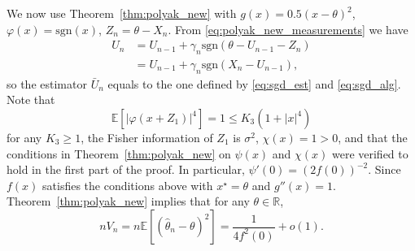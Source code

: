 \documentclass[letterpaper, 11pt]{IEEEtran}      %
\newcommand{\sgn}{\mathrm{sgn} }
\begin{document}
We now use Theorem~\ref{thm:polyak_new} with $g(x) = 0.5(x-\theta)^2$, $\varphi(x) = \sgn(x)$, $Z_n = \theta-X_n$. From \eqref{eq:polyak_new_measurements} we have
\begin{align*} 
U_n & = U_{n-1} + \gamma_n \sgn(\theta-U_{n-1} - Z_n )  \\
& = U_{n-1} + \gamma_n \sgn(X_n-U_{n-1} ),
\end{align*}
so the estimator $\bar{U}_n$ equals to the one defined by \eqref{eq:sgd_est} and \eqref{eq:sgd_alg}. Note that
\[
\mathbb E \left[ | \varphi(x+Z_1) |^4 \right] = 1 \leq K_3(1+|x|^4)
\]
for any $K_3\geq 1$, the Fisher information of $Z_1$ is $\sigma^2$, $\chi(x) = 1 > 0$, and that 
the conditions in Theorem~\ref{thm:polyak_new} on $\psi(x)$ and $\chi(x)$ were verified to hold in the first part of the proof. In particular, $\psi'(0) = (2f(0))^{-2}$. Since $f(x)$ satisfies the conditions above with $x^\star = \theta$ and $g''(x) = 1$. Theorem~\ref{thm:polyak_new} implies that for any $\theta \in \mathbb R$, 
\[
n V_n = n \mathbb E \left[ \left(\hat{\theta}_n-\theta \right)^2 \right]  = \frac{1}{4 f^2(0)} + o(1).
\]
\end{document}
